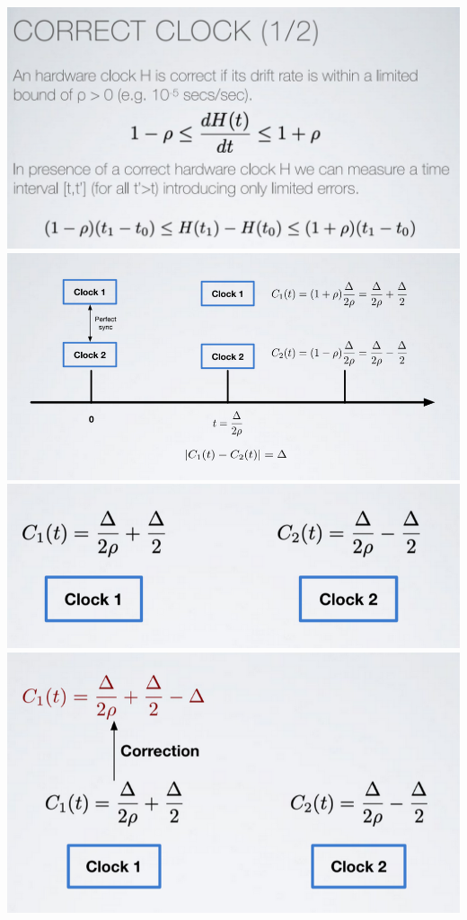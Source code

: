 \documentclass[11pt, a4paper]{article}
\begin{document}
\begin{center}
    \includegraphics[scale=0.5]{img/clocks/cc1.png}
    \includegraphics[scale=0.6]{img/clocks/cc2.png}
    \includegraphics[scale=0.7]{img/clocks/cc3.png}
    \includegraphics[scale=0.7]{img/clocks/cc4.png}
\end{center}
\end{document}
